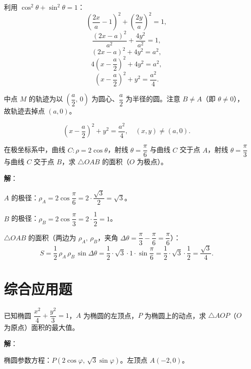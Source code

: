 \documentclass[12pt,a4paper]{ctexart}
\theoremstyle{definition}
\begin{document}
利用 $\cos^2\theta+\sin^2\theta=1$：
\[
  \left(\frac{2x}{a}-1\right)^2 + \left(\frac{2y}{a}\right)^2 = 1,
\]
\[
  \frac{(2x-a)^2}{a^2} + \frac{4y^2}{a^2} = 1,
\]
\[
  (2x-a)^2 + 4y^2 = a^2,
\]
\[
  4\!\left(x-\frac{a}{2}\right)^2 + 4y^2 = a^2,
\]
\[
  \left(x-\frac{a}{2}\right)^2 + y^2 = \frac{a^2}{4}.
\]

中点 $M$ 的轨迹为以 $\left(\dfrac{a}{2},\,0\right)$ 为圆心、$\dfrac{a}{2}$ 为半径的圆。注意 $B \neq A$（即 $\theta\neq 0$），故轨迹去掉点 $(a,0)$。

\[
  \boxed{\left(x-\frac{a}{2}\right)^2 + y^2 = \frac{a^2}{4},\quad (x,y)\neq(a,0).}
\]

\begin{example}
  在极坐标系中，曲线 $C:\rho=2\cos\theta$，射线 $\theta=\dfrac{\pi}{6}$ 与曲线 $C$ 交于点 $A$，射线 $\theta=\dfrac{\pi}{3}$ 与曲线 $C$ 交于点 $B$，求 $\triangle OAB$ 的面积（$O$ 为极点）。
\end{example}

\textbf{解}：

$A$ 的极径：$\rho_A = 2\cos\dfrac{\pi}{6} = 2\cdot\dfrac{\sqrt{3}}{2} = \sqrt{3}$。

$B$ 的极径：$\rho_B = 2\cos\dfrac{\pi}{3} = 2\cdot\dfrac{1}{2} = 1$。

$\triangle OAB$ 的面积（两边为 $\rho_A,\,\rho_B$，夹角 $\Delta\theta = \dfrac{\pi}{3}-\dfrac{\pi}{6}=\dfrac{\pi}{6}$）：
\[
  S = \frac{1}{2}\,\rho_A\,\rho_B\,\sin\Delta\theta = \frac{1}{2}\cdot\sqrt{3}\cdot 1\cdot\sin\frac{\pi}{6} = \frac{1}{2}\cdot\sqrt{3}\cdot\frac{1}{2} = \boxed{\frac{\sqrt{3}}{4}}.
\]

\newpage

\section{综合应用题}

\begin{application}
  已知椭圆 $\dfrac{x^2}{4}+\dfrac{y^2}{3}=1$，$A$ 为椭圆的左顶点，$P$ 为椭圆上的动点，求 $\triangle AOP$（$O$ 为原点）面积的最大值。
\end{application}

\textbf{解}：

椭圆参数方程：$P(2\cos\varphi,\,\sqrt{3}\sin\varphi)$。左顶点 $A(-2,0)$。
\end{document}
